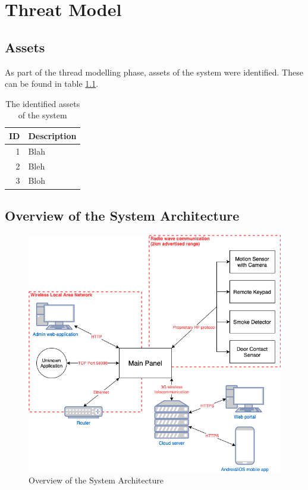 \chapter{Threat Model} \label{ch:threat-model}
\section{Assets}
As part of the thread modelling phase, assets of the system were identified. These can be found in table \ref{tb:assets}.
\begin{table}[!ht]
    \centering
    \begin{tabular}{r l}
        \hline
        \textbf{ID} & \textbf{Description} \\ \hline
        1  & Blah        \\
        2  & Bleh        \\
        3  & Bloh        \\ \hline
    \end{tabular}
    \caption{The identified assets of the system}
    \label{tb:assets}
\end{table}

\section{Overview of the System Architecture}
\begin{figure}[!ht]
  \begin{center}
    \includegraphics[width=\textwidth]{images/system-overview.png}
  \end{center}
  \caption{Overview of the System Architecture}
  \label{fig:system-overview}
\end{figure}